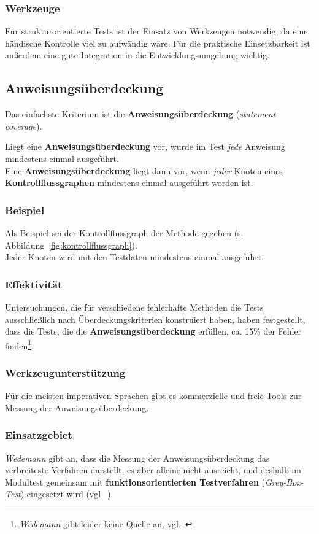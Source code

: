 \subsubsection*{Werkzeuge}
Für strukturorientierte Tests ist der Einsatz von Werkzeugen notwendig, da eine händische Kontrolle viel zu aufwändig wäre.
Für die praktische Einsetzbarkeit ist außerdem eine gute Integration in die Entwicklungsumgebung wichtig.

\subsection{Anweisungsüberdeckung}
Das einfachste Kriterium ist die \textbf{Anweisungsüberdeckung} (\textit{statement coverage}).

\begin{tcolorbox}[title=Anweisungsüberdeckung]
    Liegt eine \textbf{Anweisungsüberdeckung} vor, wurde im Test \textit{jede} Anweisung mindestens einmal ausgeführt.\\
    Eine \textbf{Anweisungsüberdeckung} liegt dann vor, wenn \textit{jeder} Knoten eines \textbf{Kontrollflussgraphen} mindestens einmal ausgeführt worden ist.
\end{tcolorbox}

\subsubsection*{Beispiel}
Als Beispiel sei der Kontrollflussgraph der Methode  gegeben (s. Abbildung~\ref{fig:kontrollflussgraph}).\\
Jeder Knoten wird mit den Testdaten  mindestens einmal ausgeführt.

\subsubsection*{Effektivität}
Untersuchungen, die für verschiedene fehlerhafte Methoden die Tests ausschließlich nach Überdeckungskriterien konstruiert haben, haben festgestellt, dass die Tests, die die \textbf{Anweisungsüberdeckung} erfüllen, ca. 15\% der Fehler finden\footnote{
\textit{Wedemann} gibt leider keine Quelle an, vgl.~\cite[51]{Wed09c}
}.

\subsubsection*{Werkzeugunterstützung}
Für die meisten imperativen Sprachen gibt es kommerzielle und freie Tools zur Messung der Anweisungsüberdeckung.

\subsubsection*{Einsatzgebiet}
\textit{Wedemann} gibt an, dass die Messung der Anweisungsüberdeckung das verbreiteste Verfahren darstellt, es aber alleine nicht ausreicht, und deshalb im Modultest gemeinsam mit \textbf{funktionsorientierten Testverfahren} (\textit{Grey-Box-Test}) eingesetzt wird (vgl.~\cite[51]{Wed09c}).